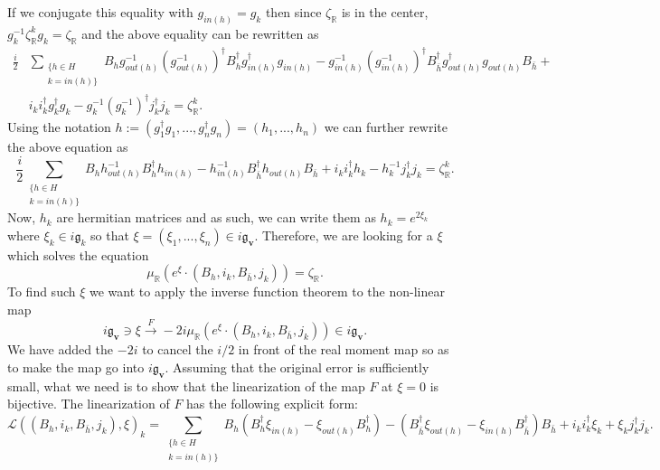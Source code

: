 \documentclass[12pt,oneside,reqno]{amsart}
\theoremstyle{definition}
\numberwithin{equation}{section}
\numberwithin{theorem}{section}
\newcommand{\R}{\mathbb{R}}
\begin{document}
%
If we conjugate this equality with $g_{in(h)} = g_k$ then since $\zeta_{\R}$ is in the center, $g_k^{-1} \zeta_{\R}^k g_k = \zeta_{\R}$ and the above equality can be rewritten as 
%
\begin{equation}
\begin{split}
\frac{i}{2}&\sum\limits_{\substack{\{h\in H\\k=in(h)\}}} B_hg_{out(h)}^{-1}(g_{out(h)}^{-1})^{\dagger}B_h^{\dagger}g_{in(h)}^{\dagger}g_{in(h)} - g_{in(h)}^{-1}(g_{in(h)}^{-1})^{\dagger}B_{\bar h}^{\dagger}g_{out(h)}^{\dagger}g_{out(h)}B_{\bar h} + \\&i_ki_k^{\dagger}g_{k}^{\dagger}g_k - g_k^{-1}(g_k^{-1})^{\dagger}j_k^{\dagger}j_k = \zeta_{\R}^k.
\end{split}
\end{equation}
%
Using the notation $h:=(g_1^\dagger g_1,...,g_n^\dagger g_n)=(h_1,...,h_n)$ we can further rewrite the above equation as 
%
\begin{equation}
\frac{i}{2}\sum\limits_{\substack{\{h\in H\\k=in(h)\}}} B_hh_{out(h)}^{-1}B_h^{\dagger}h_{in(h)} - h_{in(h)}^{-1}B_{\bar h}^{\dagger}h_{out(h)}B_{\bar h} + i_ki_k^{\dagger}h_k - h_k^{-1}j_k^{\dagger}j_k = \zeta_{\R}^k.
\end{equation}
%
Now, $h_k$ are hermitian matrices and as such, we can write them as $h_k = e^{2\xi_k}$ where $\xi_k \in i \mathfrak g_k$ so that $\xi = (\xi_1,...,\xi_n) \in i \mathfrak g_{\mathbf{v}}$. Therefore, we are looking for a $\xi$ which solves the equation
%
\begin{equation}\label{nonlinear}
\mu_{\R}(e^{\xi}\cdot (B_h,i_k,B_{\bar h}, j_k)) = \zeta_{\R}. 
\end{equation}
%
To find such $\xi$ we want to apply the inverse function theorem to the non-linear map 
%
\begin{equation}
i\mathfrak g_{\mathbf{v}}\ni\xi \xrightarrow{F} -2i\mu_{\R}(e^{\xi}\cdot (B_h,i_k,B_{\bar h}, j_k)) \in i\mathfrak g_{\mathbf{v}}.
\end{equation}
%
We have added the $-2i$ to cancel the $i/2$ in front of the real moment map so as to make the map go into $i\mathfrak g_{\mathbf{v}}$. Assuming that the original error is sufficiently small, what we need is to show that the linearization of the map $F$ at $\xi =0$ is bijective.   The linearization of $F$ has the following explicit form:
%
\begin{equation}
\mathcal L((B_h,i_k,B_{\bar h}, j_k),\xi)_k = \sum\limits_{\substack{\{h\in H\\k=in(h)\}}} B_h(B_h^{\dagger}\xi_{in(h)} - \xi_{out(h)}B_h^{\dagger}) - (B_{\bar h}^{\dagger}\xi_{out(h)} - \xi_{in(h)}B_{\bar h}^{\dagger})B_{\bar h} + i_ki_k^{\dagger}\xi_k + \xi_kj_k^{\dagger}j_k. 
\end{equation}
\end{document}
